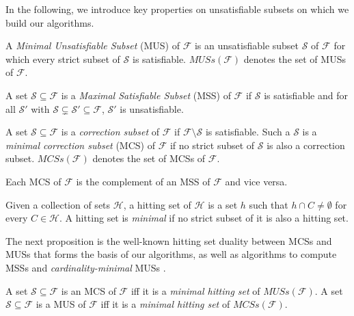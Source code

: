 \documentclass{llncs}
\newcommand\m[1]{\mathcal{#1}}
\newcommand\F{\ensuremath{\m{F} }\xspace}
\newcommand\formula{\ensuremath{\m{F} }\xspace}
\newcommand\muses[1]{\ensuremath{\mathit{MUSs}(#1)}\xspace}
\newcommand\mcses[1]{\ensuremath{\mathit{MCSs}(#1)}\xspace}
\begin{document}
	In the following, we introduce key properties on unsatisfiable subsets on which we build our algorithms.
	
	\begin{definition}
		A \emph{Minimal Unsatisfiable Subset} (MUS) of 
		\F is an unsatisfiable subset $\m{S}$ of $\F$ for which every strict subset of $\m{S} $ is satisfiable. 
		\muses{\F} denotes the set of MUSs of \F. 
	\end{definition}
	
	\begin{definition}
		A set $\m{S} \subseteq \formula$ is a \emph{Maximal Satisfiable Subset} (MSS) of $ \formula$ if $\m{S}$ is satisfiable and for all $\m{S}'$ with $\m{S}  \subsetneq  \m{S}'\subseteq\formula $, $\m{S}'$ is unsatisfiable.
	\end{definition}
	
	\begin{definition}
		A set $\m{S} \subseteq \formula$ is a \emph{correction subset} of \formula if $\formula\setminus\m{S}$ is satisfiable. 
		Such a $\m{S}$ is a \emph{minimal correction subset} (MCS)  of \formula if no strict subset of $\m{S}$ is also a correction subset. 
		\mcses{\F} denotes the set of MCSs of \F. 
	\end{definition}
	Each  MCS of \formula is the complement of an MSS of \formula and vice versa. 	
	
	\begin{definition}\label{def:minimal-hs}
		Given a collection of sets $\m{H}$, a hitting set of $\m{H}$ is a set $h$ such that  $h \cap C \neq \emptyset$ for every $C \in \m{H}$. A hitting set is \emph{minimal} if no strict subset of it is also a hitting set.
		
	\end{definition}
	
	The next proposition is the well-known hitting set duality \cite{DBLP:journals/jar/LiffitonS08,ai/Reiter87}  between MCSs and MUSs that forms the basis of our algorithms, as well as algorithms to compute MSSs \cite{DBLP:conf/sat/DaviesB13} and \emph{cardinality-minimal} MUSs \cite{ignatiev2015smallest}.
	
	\begin{proposition}\label{prop:MCS-MUS-hittingset}
		
		A set  $\m{S} \subseteq \formula$ is an MCS of $ \formula$ iff  it is a \emph{minimal hitting set} of \muses{\formula}.
		A set  $\m{S} \subseteq \formula$ is a MUS of $ \formula$ iff  it is a \emph{minimal hitting set} of \mcses{\formula}.
	\end{proposition}
	
\end{document}
